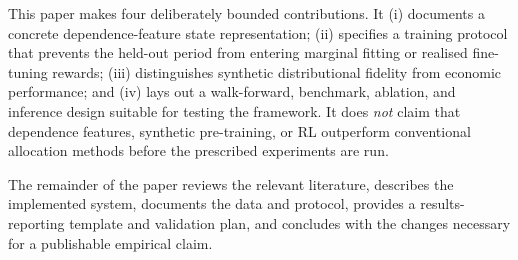 This paper makes four deliberately bounded contributions. It (i) documents a concrete dependence-feature state representation; (ii) specifies a training protocol that prevents the held-out period from entering marginal fitting or realised fine-tuning rewards; (iii) distinguishes synthetic distributional fidelity from economic performance; and (iv) lays out a walk-forward, benchmark, ablation, and inference design suitable for testing the framework. It does \emph{not} claim that dependence features, synthetic pre-training, or RL outperform conventional allocation methods before the prescribed experiments are run.

The remainder of the paper reviews the relevant literature, describes the implemented system, documents the data and protocol, provides a results-reporting template and validation plan, and concludes with the changes necessary for a publishable empirical claim.
